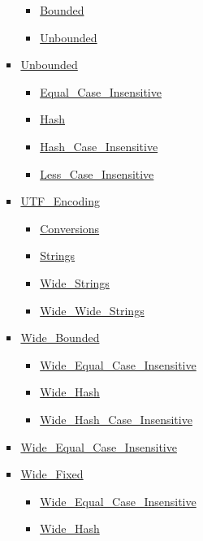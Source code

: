\begin{multicols*}{\columnnr}
\begin{scriptsize}
\begin{itemize}[leftmargin=0mm]
\begin{itemize}[leftmargin=5mm]
\begin{itemize}[leftmargin=5mm]
	  \begin{itemize}[leftmargin=5mm]
	  \item[] \href{\adarmlink{RM-A-4-12.html}}{Bounded}
	  \item[] \href{\adarmlink{RM-A-4-12.html}}{Unbounded}
	  \end{itemize}
	\item[] \href{\adarmlink{RM-A-4-5.html}}{Unbounded}
	  \begin{itemize}[leftmargin=5mm]
	  \item[] \href{\adarmlink{RM-A-4-10.html}}{Equal\_Case\_Insensitive}
	  \item[] \href{\adarmlink{RM-A-4-9.html}}{Hash}
	  \item[] \href{\adarmlink{RM-A-4-9.html}}{Hash\_Case\_Insensitive}
	  \item[] \href{\adarmlink{RM-A-4-10.html}}{Less\_Case\_Insensitive}
	  \end{itemize}
	\item[] \href{\adarmlink{RM-A-4-11.html}}{UTF\_Encoding}
	  \begin{itemize}[leftmargin=5mm]
	  \item[] \href{\adarmlink{RM-A-4-11.html}}{Conversions}
	  \item[] \href{\adarmlink{RM-A-4-11.html}}{Strings}
	  \item[] \href{\adarmlink{RM-A-4-11.html}}{Wide\_Strings}
	  \item[] \href{\adarmlink{RM-A-4-11.html}}{Wide\_Wide\_Strings}
	  \end{itemize}
	\item[] \href{\adarmlink{RM-A-4-7.html}}{Wide\_Bounded}
	  \begin{itemize}[leftmargin=5mm]
	  \item[] \href{\adarmlink{RM-A-4-7.html}}{Wide\_Equal\_Case\_Insensitive}
	  \item[] \href{\adarmlink{RM-A-4-7.html}}{Wide\_Hash}
	  \item[] \href{\adarmlink{RM-A-4-7.html}}{Wide\_Hash\_Case\_Insensitive}
	  \end{itemize}
	\item[] \href{\adarmlink{RM-A-4-7.html}}{Wide\_Equal\_Case\_Insensitive}
	\item[] \href{\adarmlink{RM-A-4-7.html}}{Wide\_Fixed}
	  \begin{itemize}[leftmargin=5mm]
	  \item[] \href{\adarmlink{RM-A-4-7.html}}{Wide\_Equal\_Case\_Insensitive}
	  \item[] \href{\adarmlink{RM-A-4-7.html}}{Wide\_Hash}

\end{itemize}
\end{itemize}
\end{itemize}
\end{itemize}
\end{scriptsize}
\end{multicols*}
